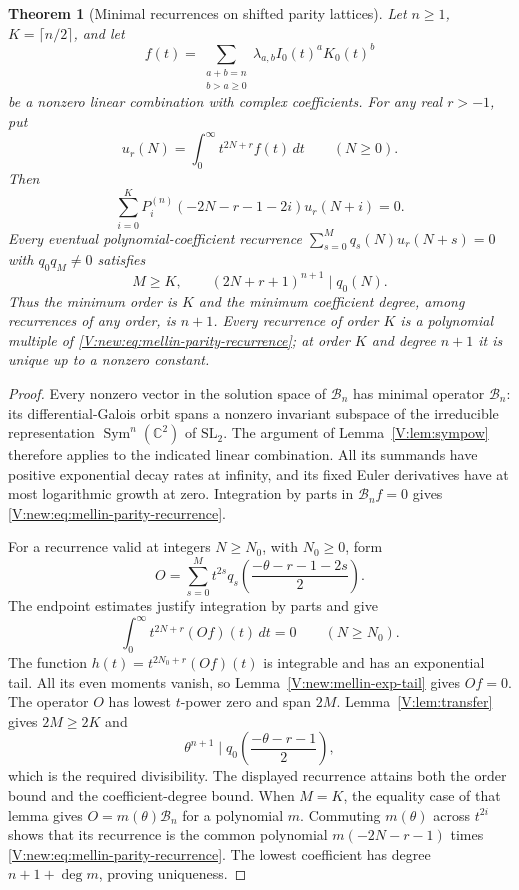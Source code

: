 \documentclass[11pt,a4paper]{article}
\newtheorem{theorem}{Theorem}[section]
\theoremstyle{definition}
\theoremstyle{remark}
\numberwithin{equation}{section}
\begin{document}
\begin{theorem}[Minimal recurrences on shifted parity lattices]
\label{V:new:mellin-parity}
Let $n\ge1$, $K=\lceil n/2\rceil$, and let
\[
 f(t)=\sum_{\substack{a+b=n\\b>a\ge0}}
       \lambda_{a,b}I_0(t)^aK_0(t)^b
\]
be a nonzero linear combination with complex coefficients.
For any real $r>-1$, put
\[
 u_r(N)=\int_0^\infty t^{2N+r}f(t)\,dt\qquad(N\ge0).
\]
Then
\begin{equation}
 \sum_{i=0}^{K}P_i^{(n)}(-2N-r-1-2i)u_r(N+i)=0.
 \label{V:new:eq:mellin-parity-recurrence}
\end{equation}
Every eventual polynomial-coefficient recurrence
$\sum_{s=0}^{M}q_s(N)u_r(N+s)=0$ with $q_0q_M\ne0$ satisfies
\[
 M\ge K,\qquad (2N+r+1)^{n+1}\mid q_0(N).
\]
Thus the minimum order is $K$ and the minimum coefficient degree,
among recurrences of any order, is $n+1$.
Every recurrence of order $K$ is a polynomial multiple of
\eqref{V:new:eq:mellin-parity-recurrence}; at order $K$ and degree
$n+1$ it is unique up to a nonzero constant.
\end{theorem}
\begin{proof}
Every nonzero vector in the solution space of $\mathcal B_n$ has
minimal operator $\mathcal B_n$: its differential-Galois orbit spans
a nonzero invariant subspace of the irreducible representation
$\operatorname{Sym}^n(\mathbb C^2)$ of $\mathrm{SL}_2$.
The argument of Lemma~\ref{V:lem:sympow} therefore applies to the
indicated linear combination. All its summands have positive
exponential decay rates at infinity, and its fixed Euler derivatives
have at most logarithmic growth at zero. Integration by parts in
$\mathcal B_nf=0$ gives
\eqref{V:new:eq:mellin-parity-recurrence}.

For a recurrence valid at integers $N\ge N_0$, with $N_0\ge0$, form
\[
 O=\sum_{s=0}^{M}t^{2s}
 q_s\!\left(\frac{-\theta-r-1-2s}{2}\right).
\]
The endpoint estimates justify integration by parts and give
\[
 \int_0^\infty t^{2N+r}(Of)(t)\,dt=0\qquad(N\ge N_0).
\]
The function $h(t)=t^{2N_0+r}(Of)(t)$ is integrable and has an
exponential tail. All its even moments vanish, so
Lemma~\ref{V:new:mellin-exp-tail} gives $Of=0$.
The operator $O$ has lowest $t$-power zero and span $2M$.
Lemma~\ref{V:lem:transfer} gives $2M\ge2K$ and
\[
 \theta^{n+1}\mid q_0\!\left(\frac{-\theta-r-1}{2}\right),
\]
which is the required divisibility. The displayed recurrence attains
both the order bound and the coefficient-degree bound.
When $M=K$, the equality case of that lemma gives
$O=m(\theta)\mathcal B_n$ for a polynomial $m$.
Commuting $m(\theta)$ across $t^{2i}$ shows that its recurrence is the
common polynomial $m(-2N-r-1)$ times
\eqref{V:new:eq:mellin-parity-recurrence}.
The lowest coefficient has degree $n+1+\deg m$, proving uniqueness.
\end{proof}
\end{document}
